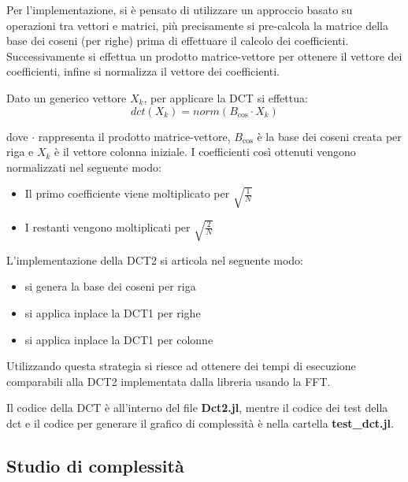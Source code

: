 Per l'implementazione, si è pensato di utilizzare un approccio basato su operazioni
tra vettori e matrici, più precisamente si pre-calcola la matrice
della base dei coseni (per righe) prima di effettuare il calcolo dei coefficienti.
Successivamente si effettua un prodotto matrice-vettore per ottenere il vettore
dei coefficienti, infine si normalizza il vettore dei coefficienti.

Dato un generico vettore $X_k$, per applicare la DCT si effettua:
\begin{equation*}
    dct(X_k) = norm(B_{\cos}\cdot X_k )
\end{equation*}

dove $\cdot$ rappresenta il prodotto matrice-vettore, $B_{\cos}$
è la base dei coseni creata per riga e $X_k$ è il vettore colonna iniziale.
I coefficienti così ottenuti vengono normalizzati nel seguente modo:
\begin{itemize}
    \item Il primo coefficiente viene moltiplicato per $\sqrt{\frac{1}{N}}$
    \item I restanti vengono moltiplicati per $\sqrt{\frac{2}{N}}$
\end{itemize}

L'implementazione della DCT2 si articola nel seguente modo:
\begin{itemize}
    \item si genera la base dei coseni per riga
    \item si applica inplace la DCT1 per righe
    \item si applica inplace la DCT1 per colonne
\end{itemize}

Utilizzando questa strategia si riesce ad ottenere dei tempi di esecuzione
comparabili alla DCT2 implementata dalla libreria usando la FFT.

Il codice della DCT è all'interno del file \textbf{Dct2.jl}, mentre il codice dei
test della dct e il codice per generare il grafico di complessità è nella cartella
\textbf{test\_dct.jl}.

\subsection{Studio di complessità}

